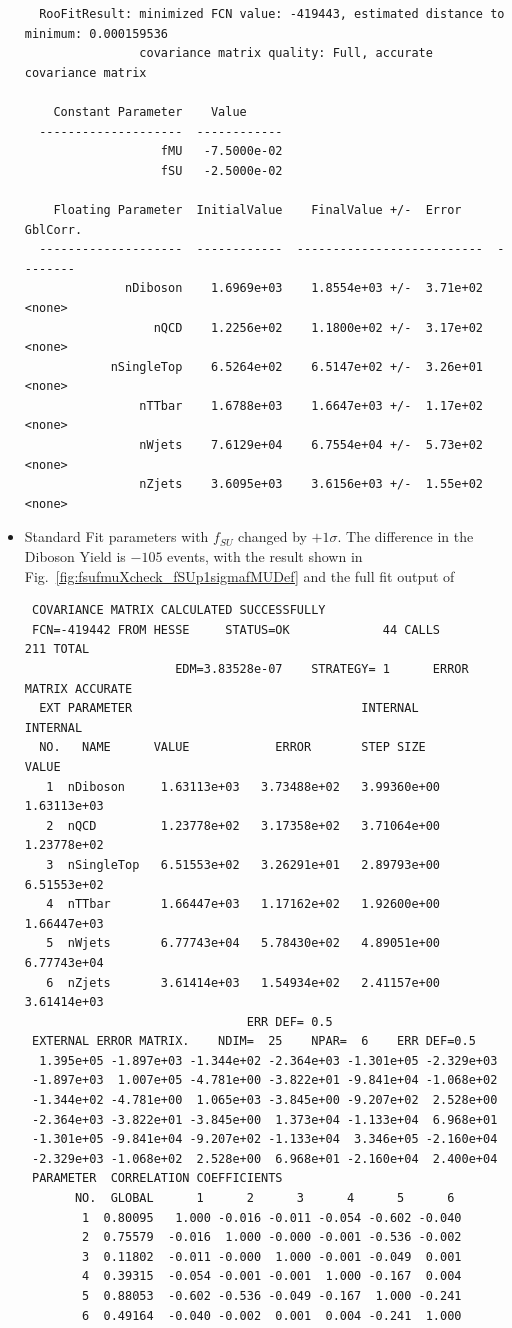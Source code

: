 \begin{itemize}
{\begin{verbatim}
  RooFitResult: minimized FCN value: -419443, estimated distance to minimum: 0.000159536
                covariance matrix quality: Full, accurate covariance matrix

    Constant Parameter    Value     
  --------------------  ------------
                   fMU   -7.5000e-02
                   fSU   -2.5000e-02

    Floating Parameter  InitialValue    FinalValue +/-  Error     GblCorr.
  --------------------  ------------  --------------------------  --------
              nDiboson    1.6969e+03    1.8554e+03 +/-  3.71e+02  <none>
                  nQCD    1.2256e+02    1.1800e+02 +/-  3.17e+02  <none>
            nSingleTop    6.5264e+02    6.5147e+02 +/-  3.26e+01  <none>
                nTTbar    1.6788e+03    1.6647e+03 +/-  1.17e+02  <none>
                nWjets    7.6129e+04    6.7554e+04 +/-  5.73e+02  <none>
                nZjets    3.6095e+03    3.6156e+03 +/-  1.55e+02  <none>

\end{verbatim}
}


\item Standard Fit parameters with $f_{SU}$ changed by $+1\sigma$. The difference in the Diboson Yield is $-105$ events, with the result shown in Fig.~\ref{fig:fsufmuXcheck_fSUp1sigmafMUDef} and the full fit output of
{\tiny
\begin{verbatim}
 COVARIANCE MATRIX CALCULATED SUCCESSFULLY
 FCN=-419442 FROM HESSE     STATUS=OK             44 CALLS         211 TOTAL
                     EDM=3.83528e-07    STRATEGY= 1      ERROR MATRIX ACCURATE 
  EXT PARAMETER                                INTERNAL      INTERNAL  
  NO.   NAME      VALUE            ERROR       STEP SIZE       VALUE   
   1  nDiboson     1.63113e+03   3.73488e+02   3.99360e+00   1.63113e+03
   2  nQCD         1.23778e+02   3.17358e+02   3.71064e+00   1.23778e+02
   3  nSingleTop   6.51553e+02   3.26291e+01   2.89793e+00   6.51553e+02
   4  nTTbar       1.66447e+03   1.17162e+02   1.92600e+00   1.66447e+03
   5  nWjets       6.77743e+04   5.78430e+02   4.89051e+00   6.77743e+04
   6  nZjets       3.61414e+03   1.54934e+02   2.41157e+00   3.61414e+03
                               ERR DEF= 0.5
 EXTERNAL ERROR MATRIX.    NDIM=  25    NPAR=  6    ERR DEF=0.5
  1.395e+05 -1.897e+03 -1.344e+02 -2.364e+03 -1.301e+05 -2.329e+03 
 -1.897e+03  1.007e+05 -4.781e+00 -3.822e+01 -9.841e+04 -1.068e+02 
 -1.344e+02 -4.781e+00  1.065e+03 -3.845e+00 -9.207e+02  2.528e+00 
 -2.364e+03 -3.822e+01 -3.845e+00  1.373e+04 -1.133e+04  6.968e+01 
 -1.301e+05 -9.841e+04 -9.207e+02 -1.133e+04  3.346e+05 -2.160e+04 
 -2.329e+03 -1.068e+02  2.528e+00  6.968e+01 -2.160e+04  2.400e+04 
 PARAMETER  CORRELATION COEFFICIENTS  
       NO.  GLOBAL      1      2      3      4      5      6
        1  0.80095   1.000 -0.016 -0.011 -0.054 -0.602 -0.040
        2  0.75579  -0.016  1.000 -0.000 -0.001 -0.536 -0.002
        3  0.11802  -0.011 -0.000  1.000 -0.001 -0.049  0.001
        4  0.39315  -0.054 -0.001 -0.001  1.000 -0.167  0.004
        5  0.88053  -0.602 -0.536 -0.049 -0.167  1.000 -0.241
        6  0.49164  -0.040 -0.002  0.001  0.004 -0.241  1.000


\end{verbatim}}
\end{itemize}
